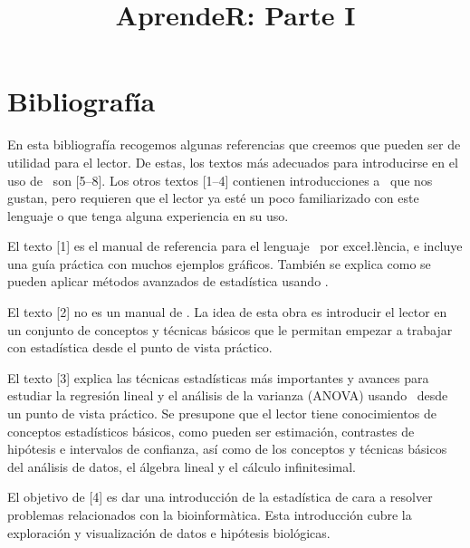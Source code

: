 




\title{\Huge AprendeR: Parte I}
\tableofcontents



















\chapter*{Bibliografía}

En esta bibliografía recogemos algunas referencias que creemos que pueden 
ser de utilidad para el lector. De estas, los textos más adecuados para introducirse en el uso de \Rt\ son \mbox{[5--8]}. Los otros textos [1--4] contienen introducciones a \Rt\ que nos gustan, pero requieren que el lector ya esté un poco familiarizado con este lenguaje o que tenga alguna experiencia en su uso.


El texto [1] es el manual de referencia para el lenguaje \Rt\ por exce\l.lència, e incluye una guía práctica con muchos ejemplos gráficos. También se explica como se pueden aplicar métodos avanzados de estadística usando \Rt.

El texto [2] no es un manual de \Rt. La idea de esta obra es introducir el lector en un conjunto de conceptos y técnicas básicos que le permitan empezar a trabajar con estadística desde el punto de vista práctico. 

El texto [3] explica las técnicas estadísticas más importantes y avances para estudiar la regresión lineal y el análisis de la varianza (ANOVA) usando \Rt\ desde un punto de vista práctico. Se presupone que el lector tiene conocimientos de conceptos estadísticos básicos, como pueden ser estimación, contrastes de hipótesis e intervalos de confianza, así como de los conceptos y técnicas básicos del análisis de datos, el álgebra lineal y el cálculo infinitesimal. 

El objetivo de [4] es dar una introducción de la estadística de cara a resolver problemas relacionados con la bioinformàtica. Esta introducción cubre la exploración y visualización de datos e hipótesis biológicas. 

